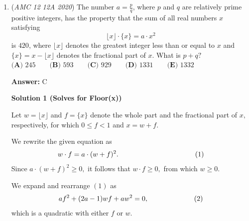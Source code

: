 \begin{enumerate}
 Substituting this into the second equation gives 
 \[3-4\sqrt{3} \cdot \frac{ 2x \sqrt{3} + \sqrt{3} }{6} = -2\sqrt{3} \left( x \cdot \frac{ 2x \sqrt{3} + \sqrt{3} }{6} - \sqrt{ (1-x^2)(1- (\frac{ 2x \sqrt{3} + \sqrt{3} }{6})^2 ) } \right)\]
 \[3-2(2x+1) = - 2\sqrt{3} \cdot x \cdot \frac{ 2x \sqrt{3} + \sqrt{3} }{6} + 2\sqrt{3} \cdot \sqrt{ (1-x^2)(1- (\frac{ 2x \sqrt{3} + \sqrt{3} }{6})^2 ) }\]
 \[3 - 2x - 2 = -2x^2 - x + 2\sqrt{3} \cdot \sqrt{ (1-x^2)(1- (\sqrt{3})^2(\frac{ 2x + 1 }{6})^2 ) }\]
 \[3 - 2x - 2 + 2x^2 + x = \sqrt{ 12 (1-x^2)(1- \frac{ 4x^2 + 4x + 1 }{12} ) }\]
 \[1 - 3x + 2x^2 = \sqrt{ (1-x^2)(11 - 4x^2 - 4x) }\]
 \[(1 - 3x + 2x^2)^2 = (1-x^2)(11 - 4x^2 - 4x)\]
 \[1 - 3x + 2x^2 - 3x + 9x^2 - 6x^3 + 2x^2 - 6x^3 + 4x^4 = 11 - 4x - 4x^2 - 11x^2 + 4x^3 + 4x^4\]
 \[1 - 6x + 13x^2 - 12x^3 = 11 - 4x - 15x^2 + 4x^3\]
 \[8x^3 - 14x^2 + x + 5 = 0\]
 \[(x-1)(4x-5)(2x+1) = 0\]
 \[\cos \alpha<1, \quad \cos \alpha = x = -\frac12, \quad s = \sqrt{ 5 - 4 \cos \alpha } = \boxed{\textbf{(B) } \sqrt{7}}\]

 \textbf{Note} This problem is very similar to 1967 AHSME Problem 40.

 


	\item (\textit{AMC 12 12A 2020}) The number $a = \frac{p}{q}$, where $p$ and $q$ are relatively prime positive integers, has the property that the sum of all real numbers $x$ satisfying
 \[\lfloor x \rfloor \cdot \{x\} = a \cdot x^2\]is $420$, where $\lfloor x \rfloor$ denotes the greatest integer less than or equal to $x$ and $\{x\} = x - \lfloor x \rfloor$ denotes the fractional part of $x$. What is $p + q?$
$\textbf{(A) } 245 \qquad \textbf{(B) } 593 \qquad \textbf{(C) } 929 \qquad \textbf{(D) } 1331 \qquad \textbf{(E) } 1332$

 \textbf{Answer: }C



\textbf{Solution 1 (Solves for Floor(x))}

Let $w=\lfloor x \rfloor$ and $f=\{x\}$ denote the whole part and the fractional part of $x,$ respectively, for which $0\leq f<1$ and $x=w+f.$

 We rewrite the given equation as 
 \[w\cdot f=a\cdot(w+f)^2. \hspace{38.75mm}(1)\]Since $a\cdot(w+f)^2\geq0,$ it follows that $w\cdot f\geq0,$ from which $w\geq0.$

 We expand and rearrange $(1)$ as 
 \[af^2+(2a-1)wf+aw^2=0, \hspace{23mm}(2)\] which is a quadratic with either $f$ or $w.$ 


\end{enumerate}
